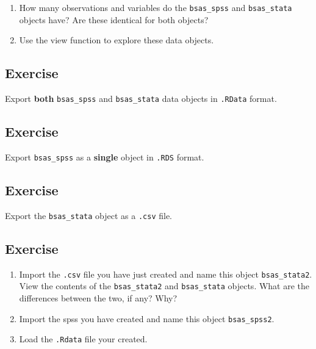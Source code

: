 \documentclass[
]{book}
\providecommand{\tightlist}{%
  \setlength{\itemsep}{0pt}\setlength{\parskip}{0pt}}
\begin{document}
\begin{enumerate}
\def\labelenumi{\alph{enumi}.}
\tightlist
\item
  How many observations and variables do the \texttt{bsas\_spss} and \texttt{bsas\_stata} objects have? Are these identical for both objects?
\item
  Use the view function to explore these data objects.
\end{enumerate}

\hypertarget{exercise-7}{%
\subsection{Exercise}\label{exercise-7}}

Export \textbf{both} \texttt{bsas\_spss} and \texttt{bsas\_stata} data objects in \texttt{.RData} format.

\hypertarget{exercise-8}{%
\subsection{Exercise}\label{exercise-8}}

Export \texttt{bsas\_spss} as a \textbf{single} object in \texttt{.RDS} format.

\hypertarget{exercise-9}{%
\subsection{Exercise}\label{exercise-9}}

Export the \texttt{bsas\_stata} object as a \texttt{.csv} file.

\hypertarget{exercise-10}{%
\subsection{Exercise}\label{exercise-10}}

\begin{enumerate}
\def\labelenumi{\alph{enumi}.}
\tightlist
\item
  Import the \texttt{.csv} file you have just created and name this object \texttt{bsas\_stata2}. View the contents of the \texttt{bsas\_stata2} and \texttt{bsas\_stata} objects. What are the differences between the two, if any? Why?
\item
  Import the spss you have created and name this object \texttt{bsas\_spss2}.
\item
  Load the \texttt{.Rdata} file your created.
\end{enumerate}
\end{document}
